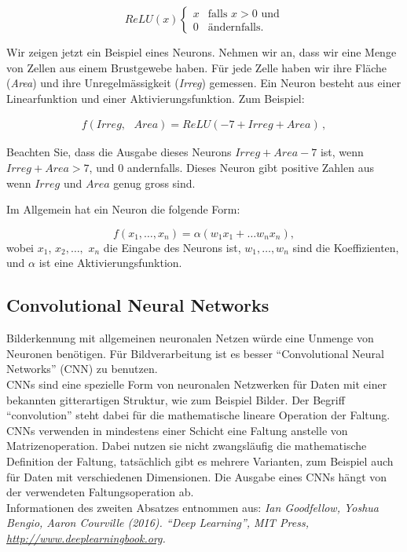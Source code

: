  \begin{equation}
 ReLU(x)
      \begin{cases}
 x & \text{falls $x > 0$ und}\\
 0 & \text{\"andernfalls.}
 \end{cases}
 \end{equation}
 
 Wir zeigen jetzt ein Beispiel eines Neurons. Nehmen wir an, dass wir eine Menge von Zellen aus einem Brustgewebe haben. F\"ur jede Zelle haben wir ihre Fl\"ache (\textit{Area}) und ihre Unregelm\"assigkeit (\textit{Irreg}) gemessen. Ein Neuron besteht aus einer Linearfunktion und einer Aktivierungsfunktion. Zum Beispiel:
 
 \begin{align}
f(Irreg,\text{ }Area) = ReLU (-7 + Irreg + Area)\,,
\label{eq:vl12-1}
\end{align}

Beachten Sie, dass die Ausgabe dieses Neurons $Irreg + Area - 7$ ist, wenn $Irreg + Area > 7$, und $0$ andernfalls. Dieses Neuron gibt positive Zahlen aus wenn $Irreg$ und $Area$ genug gross sind.

Im Allgemein hat ein Neuron die folgende Form:

\begin{equation}
    f(x_1, \ldots, x_n) = \alpha(w_1 x_1 + \ldots w_n x_n),
\end{equation}
%
wobei $x_1$, $x_2, \ldots,$ $x_n$ die Eingabe des Neurons ist, $w_1, \ldots, w_n$ sind die Koeffizienten, und $\alpha$ ist eine Aktivierungsfunktion.
 
\subsection{Convolutional Neural Networks}
\label{subsec:vl12-2}

Bilderkennung mit allgemeinen neuronalen Netzen würde eine Unmenge von Neuronen benötigen. Für Bildverarbeitung ist es besser ``Convolutional Neural Networks'' (CNN) zu benutzen.\\
CNNs sind eine spezielle Form von neuronalen Netzwerken f\"ur Daten mit einer bekannten gitterartigen Struktur, wie zum Beispiel Bilder. Der Begriff ``convolution'' steht dabei f\"ur die mathematische lineare Operation der Faltung. CNNs verwenden in mindestens einer Schicht eine Faltung anstelle von Matrizenoperation. Dabei nutzen sie nicht zwangsl\"aufig die mathematische Definition der Faltung, tats\"achlich gibt es mehrere Varianten, zum Beispiel auch f\"ur Daten mit verschiedenen Dimensionen. Die Ausgabe eines CNNs h\"angt von der verwendeten Faltungsoperation ab.\\
Informationen des zweiten Absatzes entnommen aus: \textit{Ian Goodfellow, Yoshua Bengio, Aaron Courville (2016). ``Deep Learning'', MIT Press, \url{http://www.deeplearningbook.org}.}

